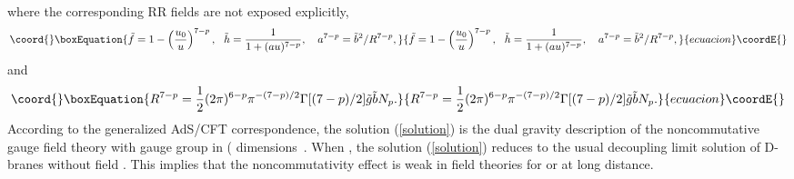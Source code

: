 \documentclass[a4paper,12pt]{article}
\begin{document}
where the corresponding RR fields are not exposed explicitly,
\begin{equation}\coord{}\boxEquation{
\tilde{f} = 1 - \left(\frac{u_0}{u}\right)^{7-p},\ \ \tilde{h} = \frac{1}
   {1+(au)^{7-p}}, \ \ \ a^{7-p} = \tilde{b}^2/R^{7-p},
\label{fha}
}{
\tilde{f} = 1 - \left(\frac{u_0}{u}\right)^{7-p},\ \ \tilde{h} = \frac{1}
   {1+(au)^{7-p}}, \ \ \ a^{7-p} = \tilde{b}^2/R^{7-p},
}{ecuacion}\coordE{}\end{equation}
and
\begin{equation}\coord{}\boxEquation{
\label{R}
R^{7-p} = \frac{1}{2}(2\pi)^{6-p}\pi^{-(7-p)/2}\Gamma[(7-p)/2]\tilde{g}
  \tilde{b} N_p.
}{
R^{7-p} = \frac{1}{2}(2\pi)^{6-p}\pi^{-(7-p)/2}\Gamma[(7-p)/2]\tilde{g}
  \tilde{b} N_p.
}{ecuacion}\coordE{}\end{equation}
According to the generalized AdS/CFT correspondence, the solution
(\ref{solution}) is  the dual gravity description
of the noncommutative gauge field theory with gauge group \coordHE{} in
(\coordHE{} dimensions~\cite{Hashimoto1,Mald1,Ali,Bar,Harmark}. When \coordHE{}, the
solution (\ref{solution}) reduces to the usual decoupling limit solution of
D\coordHE{}-branes without \coordHE{} field \cite{Itzhaki}. This implies that the
noncommutativity effect is weak in field theories for \coordHE{} or at long
distance.
\end{document}
